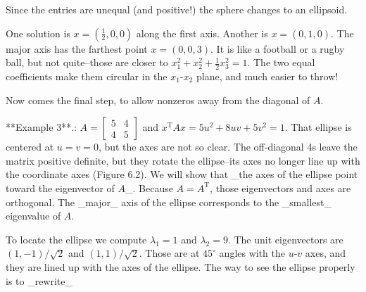 Since the entries are unequal (and positive!) the sphere changes to an ellipsoid.

One solution is \(x=(\frac{1}{2},0,0)\) along the first axis. Another is \(x=(0,1,0)\). The major axis has the farthest point \(x=(0,0,3)\). It is like a football or a rugby ball, but not quite--those are closer to \(x_{1}^{2}+x_{2}^{2}+\frac{1}{2}x_{3}^{2}=1\). The two equal coefficients make them circular in the \(x_{1}\)-\(x_{2}\) plane, and much easier to throw!

Now comes the final step, to allow nonzeros away from the diagonal of \(A\).

**Example 3**.: \(A=\left[\begin{smallmatrix}5&4\\ 4&5\end{smallmatrix}\right]\) and \(x^{\mathrm{T}}Ax=5u^{2}+8uv+5v^{2}=1\). That ellipse is centered at \(u=v=0\), but the axes are not so clear. The off-diagonal 4s leave the matrix positive definite, but they rotate the ellipse--its axes no longer line up with the coordinate axes (Figure 6.2). We will show that _the axes of the ellipse point toward the eigenvector of \(A\)_. Because \(A=A^{\mathrm{T}}\), those eigenvectors and axes are orthogonal. The _major_ axis of the ellipse corresponds to the _smallest_ eigenvalue of \(A\).

To locate the ellipse we compute \(\lambda_{1}=1\) and \(\lambda_{2}=9\). The unit eigenvectors are \((1,-1)/\sqrt{2}\) and \((1,1)/\sqrt{2}\). Those are at \(45^{\circ}\) angles with the \(u\)-\(v\) axes, and they are lined up with the axes of the ellipse. The way to see the ellipse properly is to _rewrite_ 